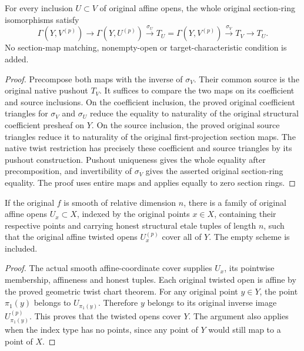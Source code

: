 \begin{theorem}
\label{thm:cartier-geometric-original-sections-iso-naturality}
\leanok
{}
For every inclusion $U\subset V$ of original affine opens, the
whole original section-ring isomorphisms satisfy
\[
 \Gamma(Y,V^{(p)})\longrightarrow\Gamma(Y,U^{(p)})
   \xrightarrow{\sigma_U}T_U
  =\Gamma(Y,V^{(p)})\xrightarrow{\sigma_V}T_V\longrightarrow T_U.
\]
No section-map matching, nonempty-open or target-characteristic
condition is added.
\end{theorem}
\begin{proof}
Precompose both maps with the inverse of $\sigma_V$. Their common
source is the original native pushout $T_V$. It suffices to compare
the two maps on its coefficient and source inclusions. On the
coefficient inclusion, the proved original coefficient triangles
for $\sigma_V$ and $\sigma_U$ reduce the equality to naturality of
the original structural coefficient presheaf on $Y$. On the source
inclusion, the proved original source triangles reduce it to
naturality of the original first-projection section maps. The
native twist restriction has precisely these coefficient and source
triangles by its pushout construction. Pushout uniqueness gives the
whole equality after precomposition, and invertibility of $\sigma_V$
gives the asserted original section-ring equality. The proof uses
entire maps and applies equally to zero section rings.
\end{proof}

\begin{theorem}
\label{thm:cartier-geometric-original-twisted-etale-cover}
\leanok
{}
If the original $f$ is smooth of relative dimension $n$, there is
a family of original affine opens $U_x\subset X$, indexed by the
original points $x\in X$, containing their respective points and
carrying honest structural etale tuples of length $n$, such that
the original affine twisted opens $U_x^{(p)}$ cover all of $Y$.
The empty scheme is included.
\end{theorem}
\begin{proof}
The actual smooth affine-coordinate cover supplies $U_x$, its
pointwise membership, affineness and honest tuples. Each original
twisted open is affine by the proved geometric twist chart theorem.
For any original point $y\in Y$, the point $\pi_1(y)$ belongs to
$U_{\pi_1(y)}$. Therefore $y$ belongs to its original inverse image
$U_{\pi_1(y)}^{(p)}$. This proves that the twisted opens cover $Y$.
The argument also applies when the index type has no points, since
any point of $Y$ would still map to a point of $X$.
\end{proof}

